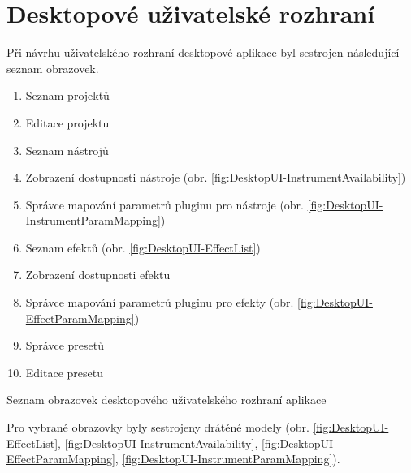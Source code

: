 \documentclass[thesis=M,czech]{FITthesis}[2019/03/06]
\begin{document}
	\section{Desktopové uživatelské rozhraní}
		Při návrhu uživatelského rozhraní desktopové aplikace byl sestrojen následující seznam obrazovek.
		\begin{mylist}
			\begin{enumerate}[label=\textbf{D\arabic*.}]
				\item Seznam projektů
				\item Editace projektu
				\item Seznam nástrojů
				\item Zobrazení dostupnosti nástroje (obr. \ref{fig:DesktopUI-InstrumentAvailability})
				\item Správce mapování parametrů pluginu pro nástroje (obr. \ref{fig:DesktopUI-InstrumentParamMapping})
				\item Seznam efektů (obr. \ref{fig:DesktopUI-EffectList})
				\item Zobrazení dostupnosti efektu
				\item Správce mapování parametrů pluginu pro efekty	(obr. \ref{fig:DesktopUI-EffectParamMapping})		
				\item Správce presetů
				\item Editace presetu
			\end{enumerate}
			\caption{Seznam obrazovek desktopového uživatelského rozhraní aplikace}\label{list:DesktopUIScreen}		
		\end{mylist}
	
		Pro vybrané obrazovky byly sestrojeny drátěné modely 
		(obr. \ref{fig:DesktopUI-EffectList}, \ref{fig:DesktopUI-InstrumentAvailability}, 
		\ref{fig:DesktopUI-EffectParamMapping}, \ref{fig:DesktopUI-InstrumentParamMapping}).
		
\end{document}
